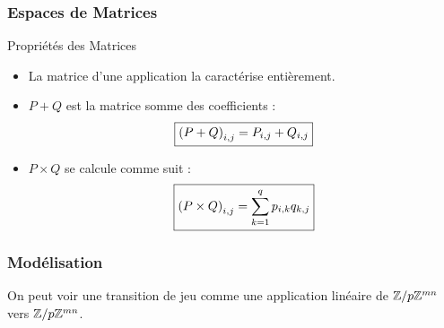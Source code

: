 \documentclass{beamercours}
\begin{document}
\begin{frame}
    \frametitle{Espaces de Matrices}
    \begin{propositionfr}{Propriétés des Matrices}{}
        \begin{itemize}[<+->]
            \item La matrice d'une application la caractérise entièrement.
            \item $P + Q$ est la matrice somme des coefficients : \vspace{-10pt}
                  \[
                      \boxed{\left(P + Q\right)_{i, j} = P_{i, j} + Q_{i, j}}\vspace{-10pt}
                  \]
            \item $P\times Q$ se calcule comme suit : \vspace{-10pt}
                  \[
                      \boxed{\left(P\times Q\right)_{i, j} = \sum_{k = 1}^{q} p_{i, k}q_{k, j}}\vspace{-10pt}
                  \]
        \end{itemize}
    \end{propositionfr}
\end{frame}

\begin{frame}
    \frametitle{Modélisation}
    On peut voir une transition de jeu comme une application linéaire de $\mathbb{Z}/p\mathbb{Z}^{mn}$ vers $\mathbb{Z}/p\mathbb{Z}^{mn}$.
\end{frame}
\end{document}
